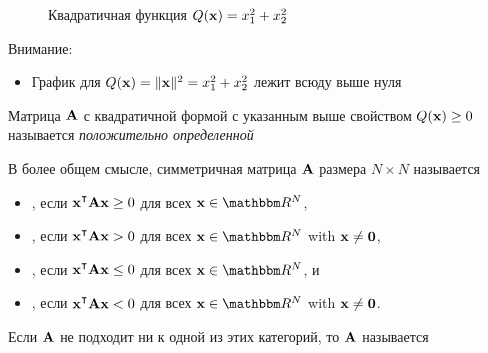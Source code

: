\begin{frame}
    
    \vspace{2em}
    \begin{figure}
   \begin{center}
    \caption{\label{f:qform_pd} Квадратичная функция $Q({\mathbf x}) = x_1^2 + x_2^2$ }
   \end{center}
    \end{figure}

\end{frame}

\begin{frame}

    \vspace{2em}
    Внимание:
    \begin{itemize}
        \item График для $Q({\mathbf x}) = \| {\mathbf x} \|^2 = x_1^2 + x_2^2$ лежит всюду выше нуля
    \end{itemize}
    
    \vspace{.7em}
    Матрица $\mathbf A$ с квадратичной формой с указанным выше свойством $Q({\mathbf x}) \geq 0$  называется \emph{положительно определенной}
    
\end{frame}

\begin{frame}

    \vspace{2em}
    В более общем смысле, симметричная матрица $\mathbf A$ размера $N \times N$ называется
    \begin{itemize}
        \item {}, если $\boldx^\T \boldA \boldx \geq 0$
            для всех $\boldx \in \RR^N$, 
        \item {}, если $\boldx^\T \boldA \boldx > 0$ для всех $\boldx \in \RR^N$ with ${\mathbf x} \not= {\mathbf 0}$,
        \item {}, если $\boldx^\T \boldA \boldx \leq 0$
            для всех $\boldx \in \RR^N$, и
        \item {}, если $\boldx^\T \boldA \boldx < 0$ для всех $\boldx \in \RR^N$ with ${\mathbf x} \not= {\mathbf 0}$.
    \end{itemize}
    
    \vspace{.7em}
    Если $\mathbf A$ не подходит ни к одной из этих категорий, то $\mathbf A$ называется 
    
\end{frame}

